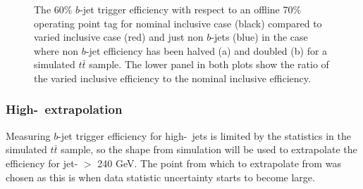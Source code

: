 \begin{figure}[!ht]
  \begin{center}
    \captionsetup[subfigure]{aboveskip=0pt,justification=centering}
  \end{center}
  \caption{The 60\% $b$-jet trigger efficiency with respect to an offline 70\% operating point tag
    for nominal inclusive case (black) compared to varied inclusive case (red) and just non $b$-jets (blue)
    in the case where non $b$-jet efficiency has been halved (a) and doubled (b) for a simulated $t\bar{t}$ sample.
    The lower panel in both plots show the ratio of the varied inclusive efficiency to the nominal inclusive efficiency.
  }
  \label{fig:Eff_LTrigEff}
\end{figure}

\FloatBarrier

\subsubsection{High-\pT~extrapolation}
\label{sec:trig-highPtExtrap}

Measuring $b$-jet trigger efficiency for high-\pT~jets is limited by the statistics in the simulated $t\bar{t}$ sample,
so the shape from simulation will be used to extrapolate the efficiency for jet-\pT{} $>$ 240 GeV.
The point from which to extrapolate from was chosen as this is when data statistic uncertainty starts to become large. 

